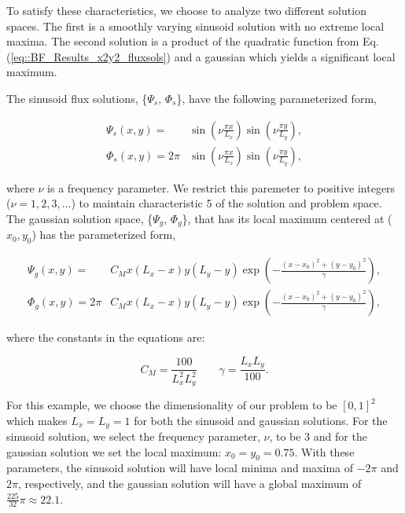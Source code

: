 \noindent To satisfy these characteristics, we choose to analyze two different solution spaces. The first is a smoothly varying sinusoid solution with no extreme local maxima. The second solution is a product of the quadratic function from Eq. (\ref{eq::BF_Results_x2y2_fluxsols}) and a gaussian which yields a significant local maximum. 

The sinusoid flux solutions, \{$\Psi_s$, $\Phi_s$\}, have the following parameterized form,

\begin{equation}
\label{eq::BF_Results_MMS_sinefluxsols}
\begin{aligned}
\Psi_s (x,y) = &\sin(\nu  \frac{\pi x}{L_x}) \sin(\nu  \frac{\pi y}{L_y}), \\ 
\Phi_s (x,y) = 2 \pi &\sin(\nu  \frac{\pi x}{L_x}) \sin(\nu  \frac{\pi y}{L_y}),
\end{aligned} 
\end{equation}

\noindent where $\nu$ is a frequency parameter. We restrict this paremeter to positive integers ($\nu = 1,2,3,...$) to maintain characteristic 5 of the solution and problem space. The gaussian solution space, \{$\Psi_g$, $\Phi_g$\}, that has its local maximum centered at ($x_0,y_0$) has the parameterized form,

\begin{equation}
\label{eq::BF_Results_MMS_gaussfluxsols}
\begin{aligned}
\Psi_g (x,y) = &C_M x (L_x - x) y (L_y - y) \exp(-\frac{(x-x_0)^2 + (y-y_0)^2}{\gamma}), \\ 
\Phi_g (x,y) = 2 \pi &C_M x (L_x - x) y (L_y - y) \exp(-\frac{(x-x_0)^2 + (y-y_0)^2}{\gamma}),
\end{aligned} 
\end{equation}

\noindent where the constants in the equations are:

\begin{equation}
\label{eq::BF_Results_MMS_gaussconsts}
C_M = \frac{100}{L_x^2 L_y^2} \qquad \gamma = \frac{L_x L_y}{100} .
\end{equation}

For this example, we choose the dimensionality of our problem to be $[0,1]^2$ which makes $L_x=L_y=1$ for both the sinusoid and gaussian solutions. For the sinusoid solution, we select the frequency parameter, $\nu$, to be 3 and for the gaussian solution we set the local maximum: $x_0=y_0 = 0.75$. With these parameters, the sinusoid solution will have local minima and maxima of $-2 \pi$ and $2 \pi$, respectively, and the gaussian solution will have a global maximum of $\frac{225}{32} \pi \approx 22.1$.

